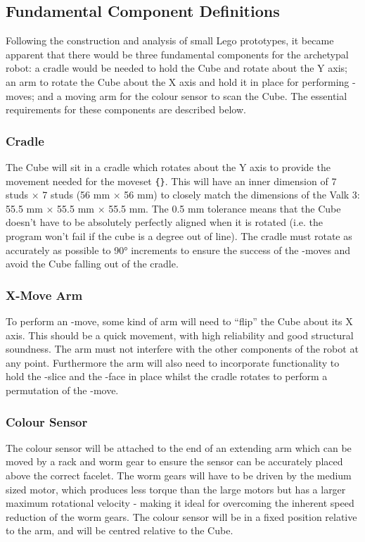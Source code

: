 \documentclass{report}
\newcommand{\moveset}[1]{\uppercase{\texttt{\{\formatmoves{#1}\}}}}
\newcommand{\face}[1]{\uppercase{\texttt{\formatmovesnospace{#1}}}-face}
\newcommand{\move}[1]{\uppercase{\texttt{\formatmovesnospace{#1}}}-move}
\newcommand{\slice}[1]{\uppercase{\texttt{\formatmovesnospace{#1}}}-slice}
\begin{document}
    \subsection{Fundamental Component Definitions} \label{sec:componentDefinitions}
    
    Following the construction and analysis of small Lego prototypes, it became apparent that there would be three fundamental components for the archetypal robot: a cradle would be needed to hold the Cube and rotate about the Y axis; an arm to rotate the Cube about the X axis and hold it in place for performing \move{d}s; and a moving arm for the colour sensor to scan the Cube. The essential requirements for these components are described below.
    
    \subsubsection{Cradle}
    
    The Cube will sit in a cradle which rotates about the Y axis to provide the movement needed for the moveset \moveset{Y.Y'y2D.D'd2}. This will have an inner dimension of 7 studs $\times$ 7 studs (56 \si{\milli\metre} $\times$ 56 \si{\milli\metre}) to closely match the dimensions of the Valk 3: 55.5 \si{\milli\metre} $\times$ 55.5 \si{\milli\metre} $\times$ 55.5 \si{\milli\metre}. The 0.5 \si{\milli\metre} tolerance means that the Cube doesn't have to be absolutely perfectly aligned when it is rotated (i.e. the program won't fail if the cube is a degree out of line). The cradle must rotate as accurately as possible to \ang{90} increments to ensure the success of the \move{x}s and avoid the Cube falling out of the cradle. 
    
    \subsubsection{X-Move Arm}
    To perform an \move{x}, some kind of arm will need to \enquote{flip} the Cube about its X axis. This should be a quick movement, with high reliability and good structural soundness. The arm must not interfere with the other components of the robot at any point. Furthermore the arm will also need to incorporate functionality to hold the \slice{l-r} and the \face{u} in place whilst the cradle rotates to perform a permutation of the \move{d}.
    
    \subsubsection{Colour Sensor}
    The colour sensor will be attached to the end of an extending arm which can be moved by a rack and worm gear to ensure the sensor can be accurately placed above the correct facelet. The worm gears will have to be driven by the medium sized motor, which produces less torque than the large motors but has a larger maximum rotational velocity - making it ideal for overcoming the inherent speed reduction of the worm gears. The colour sensor will be in a fixed position relative to the arm, and will be centred relative to the Cube.
    
\end{document}
